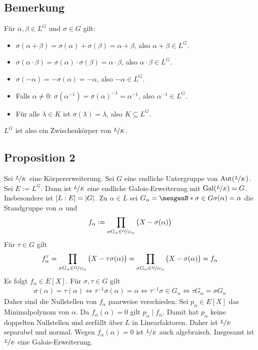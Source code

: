 \subsection[Bemerkung: Begründung warum der Fixkörper ein Körper ist]{Bemerkung} %
\label{sub:175}
Für $\alpha, \beta \in L^G$ und $\sigma \in G$ gilt: 
\begin{itemize}
	\item $\sigma(\alpha + \beta)= \sigma(\alpha)+ \sigma(\beta)= \alpha + \beta$, also $\alpha+ \beta \in L^G$.
	\item $\sigma(\alpha \cdot \beta) = \sigma(\alpha) \cdot \sigma(\beta) = \alpha \cdot  \beta$, also $\alpha \cdot \beta \in L^G$.
	\item $\sigma(-\alpha)= - \sigma(\alpha) = - \alpha$, also $- \alpha \in L^G$.
	\item Falls $\alpha \not= 0$: $ \sigma(\alpha ^{-1}) = \sigma(\alpha) ^{-1} = \alpha ^{-1}$, also $\alpha ^{-1} \in L^G$.
	\item Für alle $\lambda  \in K$ ist $\sigma(\lambda )=\lambda$, also $K \subseteq L^G$.
\end{itemize}
$L^G$ ist also ein Zwischenkörper von $\nicefrac{L}{K}$.

\subsection[Proposition 2: Die Galois-Gruppe zu $L^G$ ist gleich der Untergruppe $G \le \Aut(\nicefrac{L}{K})$]{Proposition 2} %
\label{sub:176}
Sei $\nicefrac{L}{K}$ eine Körpererweiterung. Sei $G$ eine endliche Untergruppe von $\operatorname{Aut}(\nicefrac{L}{K})$. Sei $E:= L^G$. Dann ist $\nicefrac{L}{E}$ eine
endliche Galois-Erweiterung mit $\operatorname{Gal}(\nicefrac{L}{E}) = G$. Insbesondere ist $[L:E]= \lvert G\rvert $.
Zu $\alpha \in L$ sei $G_\alpha = \set[\sigma \in G]{\sigma(\alpha)=\alpha}$ die Standgruppe von $\alpha$ und 
\[
	f_\alpha := \prod_{\sigma G_\alpha \in \nicefrac{G}{G_\alpha}} \big(X-\sigma(\alpha)\big)
\]
Für $\tau \in G$ gilt 
\[
	f^\tau_\alpha = \prod_{\sigma G_\alpha \in \nicefrac{G}{G_\alpha}} \big(X-\tau\sigma(\alpha)\big) = \prod_{\sigma G_\alpha \in \nicefrac{G}{G_\alpha}} \big(X-\sigma(\alpha)\big)= f_\alpha
\]
Es folgt $f_\alpha \in E[X]$. Für $\sigma, \tau \in G$ gilt 
\begin{align*}
	\sigma(\alpha)=\tau(\alpha) \iff \tau ^{-1} \sigma(\alpha)= \alpha \iff \tau ^{-1} \sigma \in G_\alpha 
	\iff \tau G_\alpha = \sigma G_\alpha
\end{align*}
Daher sind die Nullstellen von $f_\alpha$ paarweise verschieden. Sei $p_\alpha \in E[X]$ das Minimalpolynom von $\alpha$. Da $f_\alpha(\alpha)=0$ gilt 
$p_\alpha \mid f_\alpha$. Damit hat $p_\alpha$ keine doppelten Nullstellen und zerfällt über $L$ in Linearfaktoren. Daher ist $\nicefrac{L}{E}$ separabel und normal.
Wegen $f_\alpha(\alpha)=0$ ist $\nicefrac{L}{E}$ auch algebraisch. Insgesamt ist $\nicefrac{L}{E}$ eine Galois-Erweiterung.

